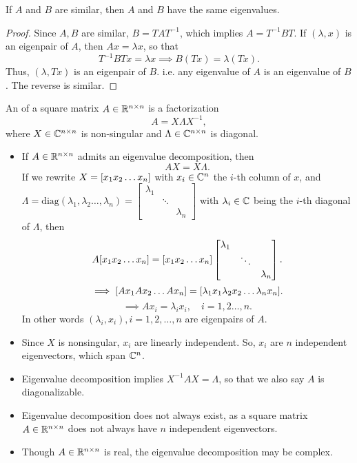 \documentclass[../main/main.tex]{subfiles}
\begin{document}
\begin{theorem}
	If $A$ and $B$ are similar, then $A$ and $B$ have the same eigenvalues.
\end{theorem}
\begin{proof}
		Since $A,B$ are similar, $B=TAT^{-1}$, which implies $A=T^{-1}BT$. If $\left( \lambda, x \right) $ is an eigenpair of $A$, then $Ax=\lambda x$, so that \[
				T^{-1}BTx=\lambda x\implies B\left( Tx \right) =\lambda\left( Tx \right) 
		.\] Thus, $\left( \lambda, Tx \right) $ is an eigenpair of $B$. i.e. any eigenvalue of $A$ is an eigenvalue of $B$. The reverse is similar.
\end{proof}
\begin{definition}
	An  of a square matrix $A\in \mathbb{R}^{n\times n}$ is a factorization \[
		A=X\Lambda X^{-1}
		,\] where $X\in\mathbb{C}^{n\times n}$ is non-singular and $\Lambda\in\mathbb{C}^{n\times n}$ is diagonal.
\end{definition}
\begin{itemize}
		\item If $A\in \mathbb{R}^{n\times n}$ admits an eigenvalue decomposition, then \[
		AX=X\Lambda
	.\] If we rewrite $X=[x_1\space x_2\space \ldots\space x_n]$ with $x_{i}\in \mathbb{C}^{n}$ the $i$-th column of $x$, and $\Lambda=\text{diag}(\lambda_1,\lambda_2\ldots,\lambda_n)=\begin{bmatrix} \lambda_1&&\\&\ddots&\\&&\lambda_n \end{bmatrix} $ with $\lambda_{i}\in \mathbb{C}$ being the $i$-th diagonal of $\Lambda$, then \[
	A[x_1\space x_2\space \ldots\space x_n]=[x_1\space x_2\space \ldots\space x_n]\begin{bmatrix} \lambda_1&&\\&\ddots&\\&&\lambda_n \end{bmatrix}
	.\] \[
		\implies [Ax_1\space Ax_2\space \ldots\space Ax_n]=[\lambda_1 x_1\space \lambda_2 x_2\space \ldots\space \lambda_n x_n]
	.\] \[
		\implies Ax_{i}=\lambda_ix_{i},\quad i=1,2\ldots,n
	.\] 
	In other words $\left( \lambda_i,x_{i} \right) ,i=1,2,\ldots,n$ are eigenpairs of $A$.
\item Since $X$ is nonsingular, $x_{i}$ are linearly independent. So, $x_{i}$ are $n$ independent eigenvectors, which span $\mathbb{C}^{n}$.
\item Eigenvalue decomposition implies $X^{-1}A X = \Lambda$, so that we also say $A$ is diagonalizable.
\item Eigenvalue decomposition does not always exist, as a square matrix $A\in \mathbb{R}^{n\times n}$ does not always have $n$ independent eigenvectors.
\item Though $A\in \mathbb{R}^{n\times n}$ is real, the eigenvalue decomposition may be complex.
\end{itemize}
\end{document}
